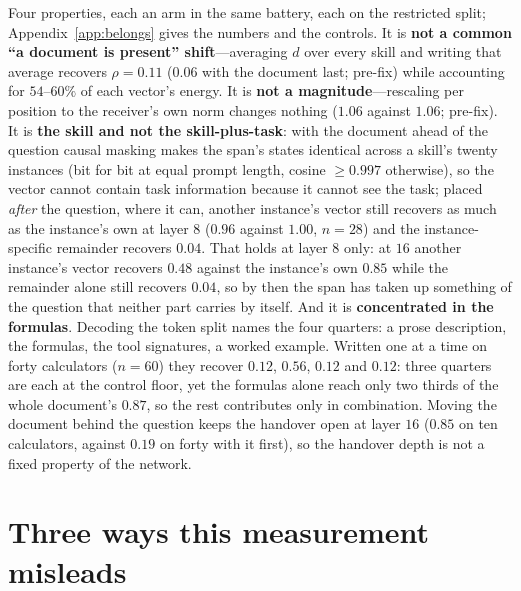 \documentclass{article}
\newcommand{\dvec}{\ensuremath{d}}
\begin{document}
Four properties, each an arm in the same battery, each on the restricted split;
Appendix~\ref{app:belongs} gives the numbers and the controls. It is
\textbf{not a common ``a document is present'' shift}---averaging $\dvec$ over
every skill and writing that average recovers $\rho=0.11$ ($0.06$ with the
document last; pre-fix) while accounting for $54$--$60\%$ of each vector's
energy. It is \textbf{not a magnitude}---rescaling per position to the
receiver's own norm changes nothing ($1.06$ against $1.06$; pre-fix). It is \textbf{the skill and
not the skill-plus-task}: with the document ahead of the question causal masking
makes the span's states identical across a skill's twenty instances (bit for bit
at equal prompt length, cosine $\ge 0.997$ otherwise), so the vector cannot contain task
information because it cannot see the task; placed \emph{after} the question,
where it can, another instance's vector still recovers as much as the instance's
own at layer $8$ ($0.96$ against $1.00$, $n=28$) and the instance-specific
remainder recovers $0.04$. That holds at layer $8$ only: at $16$ another
instance's vector recovers $0.48$ against the instance's own $0.85$ while the
remainder alone still recovers $0.04$, so by then the span has taken up
something of the question that neither part carries by itself. And it is
\textbf{concentrated in the formulas}. Decoding the token split names the four
quarters: a prose description, the formulas, the tool signatures, a worked
example. Written one at a time on forty calculators ($n=60$) they recover
$0.12$, $\mathbf{0.56}$, $0.12$ and $0.12$: three quarters are each at the
control floor, yet the formulas alone reach only two thirds of the whole
document's $0.87$, so the rest contributes only in combination. Moving the
document behind the question keeps the handover open at layer $16$ ($0.85$ on ten
calculators, against $0.19$ on forty with it first), so the handover depth is not a fixed property of
the network.

\section{Three ways this measurement misleads}
\label{sec:traps}
\end{document}
